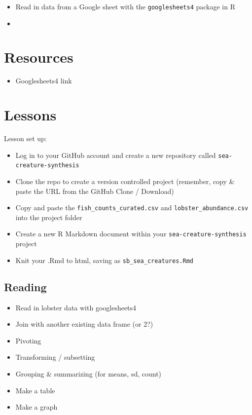 \documentclass[]{book}
\providecommand{\tightlist}{%
  \setlength{\itemsep}{0pt}\setlength{\parskip}{0pt}}
\begin{document}
\begin{itemize}
\item
  Read in data from a Google sheet with the \texttt{googlesheets4} package in R
\item
\end{itemize}

\hypertarget{resources-8}{%
\section{Resources}\label{resources-8}}

\begin{itemize}
\tightlist
\item
  Googlesheets4 link
\end{itemize}

\hypertarget{lessons-3}{%
\section{Lessons}\label{lessons-3}}

Lesson set up:

\begin{itemize}
\tightlist
\item
  Log in to your GitHub account and create a new repository called \texttt{sea-creature-synthesis}
\item
  Clone the repo to create a version controlled project (remember, copy \& paste the URL from the GitHub Clone / Download)
\item
  Copy and paste the \texttt{fish\_counts\_curated.csv} and \texttt{lobster\_abundance.csv} into the project folder
\item
  Create a new R Markdown document within your \texttt{sea-creature-synthesis} project
\item
  Knit your .Rmd to html, saving as \texttt{sb\_sea\_creatures.Rmd}
\end{itemize}

\hypertarget{reading-2}{%
\subsection{Reading}\label{reading-2}}

\begin{itemize}
\tightlist
\item
  Read in lobster data with googlesheets4
\item
  Join with another existing data frame (or 2?)
\item
  Pivoting
\item
  Transforming / subsetting
\item
  Grouping \& summarizing (for means, sd, count)
\item
  Make a table
\item
  Make a graph
\end{itemize}
\end{document}
